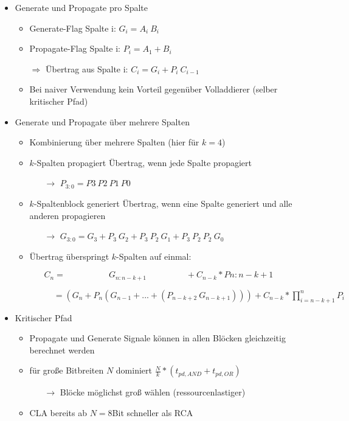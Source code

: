 \begin{itemize}
\begin{itemize}
	\item Generate und Propagate pro Spalte
		\begin{itemize}
		\item Generate-Flag Spalte i:						$G_i = A_i~B_i$
		\item Propagate-Flag Spalte i:						$P_i = A_1+B_i$
		\item[$\Rightarrow$] Übertrag aus Spalte i:		$C_i = G_i + P_i~C_{i-1}$
		\item Bei naiver Verwendung kein Vorteil gegenüber Volladdierer (selber kritischer Pfad)
		\end{itemize}			
	
	\item Generate und Propagate über mehrere Spalten
		\begin{itemize}
		\item Kombinierung über mehrere Spalten (hier für $k=4$)
		\item $k$-Spalten propagiert Übertrag, wenn jede Spalte propagiert
			\begin{itemize}
			\item[$\rightarrow$] $P_{3:0}=P3~P2~P1~P0$
			\end{itemize}
		\item $k$-Spaltenblock generiert Übertrag, wenn eine Spalte generiert und alle anderen propagieren
			\begin{itemize}
			\item[$\rightarrow$] $G_{3:0} = G_3 + P_3~G_2 + P_3~P_2~G_1+P_3~P_2~P_2~G_0$
			\end{itemize}
		\item Übertrag überspringt $k$-Spalten auf einmal:
			\begin{itemize}
			\item[] $C_n = ~~~~~~~~~~~~~~~~~~~~~~~G_{n:n-k+1}~~~~~~~~~~~~~~~~~~~~~ + C_{n-k} * P{n:n-k+1}$
			\item[] $~~~~~ = (G_n + P_n (G_{n-1} +...+ (P_{n-k+2}~G_{n-k+1}))) + C_{n-k} * \prod^n_{i=n-k+1}P_i$
			\end{itemize}
		\end{itemize}
	\item Kritischer Pfad
		\begin{itemize}
		\item Propagate und Generate Signale können in allen Blöcken gleichzeitig berechnet werden
		\item für große Bitbreiten $N$ dominiert $\frac{N}{k} * (t_{pd,AND} + t_{pd,OR})$
			\begin{itemize}
			\item[$\rightarrow$] Blöcke möglichst groß wählen (ressourcenlastiger)
			\end{itemize}
		\item CLA bereits ab $N = 8$Bit schneller als RCA
		\end{itemize}
	\end{itemize}
	

\end{itemize}
